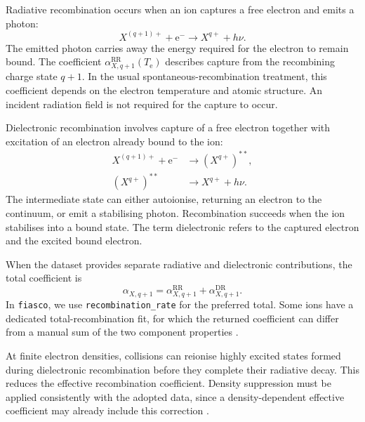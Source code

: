 \documentclass[a4paper,10pt,twoside,openany]{book}
\newenvironment{caution}[1]{%
  \begin{tcolorbox}[notebox,colback=LightOrange,colframe=Cap2Orange,
    colbacktitle=Cap2Orange,coltitle=white,
    title={#1}]}{\end{tcolorbox}}
\begin{document}
Radiative recombination occurs when an ion captures a free electron and emits
a photon:
\begin{equation}
 X^{(q+1)+}+\mathrm e^-
 \longrightarrow X^{q+}+h\nu.
 \label{eq:ion_rr_reaction}
\end{equation}
The emitted photon carries away the energy required for the electron to remain
bound. The coefficient \(\alpha_{X,q+1}^{\mathrm{RR}}(T_{\mathrm e})\)
describes capture from the recombining charge state \(q+1\). In the usual
spontaneous-recombination treatment, this coefficient depends on the electron
temperature and atomic structure. An incident radiation field is not required
for the capture to occur.

Dielectronic recombination involves capture of a free electron together with
excitation of an electron already bound to the ion:
\begin{align}
 X^{(q+1)+}+\mathrm e^-
 &\longrightarrow (X^{q+})^{**},
 \nonumber\\
 (X^{q+})^{**}
 &\longrightarrow X^{q+}+h\nu.
 \label{eq:ion_dr_reaction}
\end{align}
The intermediate state can either autoionise, returning an electron to the
continuum, or emit a stabilising photon. Recombination succeeds when the ion
stabilises into a bound state. The term dielectronic refers to the captured
electron and the excited bound electron.

When the dataset provides separate radiative and dielectronic contributions,
the total coefficient is
\begin{equation}
 \alpha_{X,q+1}
 =\alpha_{X,q+1}^{\mathrm{RR}}
 +\alpha_{X,q+1}^{\mathrm{DR}}.
 \label{eq:ion_total_recombination}
\end{equation}
In \texttt{fiasco}, we use \texttt{recombination\_rate} for the preferred total.
Some ions have a dedicated total-recombination fit, for which the returned
coefficient can differ from a manual sum of the two component properties
\cite{fiasco_rates}.

\begin{caution}{Density suppression of recombination}
At finite electron densities, collisions can reionise highly excited states
formed during dielectronic recombination before they complete their radiative
decay. This reduces the effective recombination coefficient. Density suppression
must be applied consistently with the adopted data, since a density-dependent
effective coefficient may already include this correction
\cite{nikolic2018}.
\end{caution}
\end{document}
